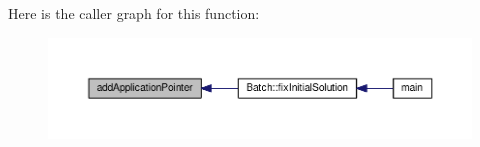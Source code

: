 Here is the caller graph for this function\-:\nopagebreak
\begin{figure}[H]
\begin{center}
\leavevmode
\includegraphics[width=350pt]{appByWeight_8hh_aade8f908ef9c582df27a535457f29b00_icgraph}
\end{center}
\end{figure}


